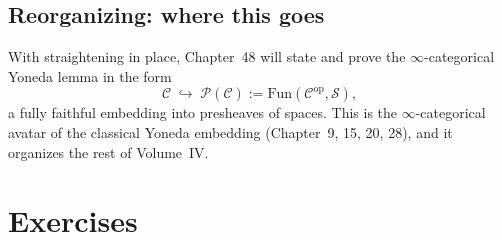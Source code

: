 \subsection{Reorganizing: where this goes}

\begin{remark}
With straightening in place, Chapter~48 will state and prove the
$\infty$-categorical Yoneda lemma in the form
\begin{equation*}
  \mathcal{C} \;\hookrightarrow\; \mathcal{P}(\mathcal{C}) := \mathrm{Fun}(\mathcal{C}^{\mathrm{op}}, \mathcal{S}),
\end{equation*}
a fully faithful embedding into presheaves of spaces. This is the
$\infty$-categorical avatar of the classical Yoneda embedding (Chapter~9,
15, 20, 28), and it organizes the rest of Volume~IV.
\end{remark}


\section{Exercises}
\label{sec:straightening-exercises}

